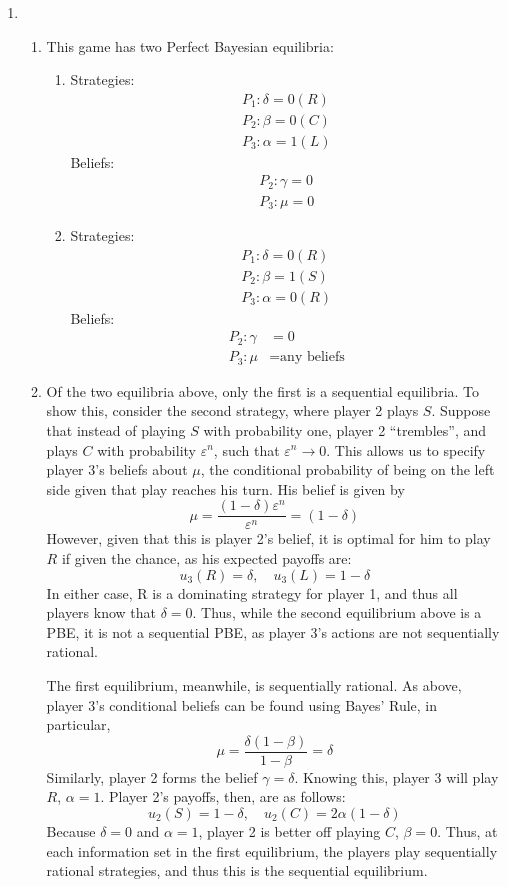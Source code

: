 \documentclass[11pt]{article}
\begin{document}
\begin{enumerate}
	\item \begin{enumerate}
		\item This game has two Perfect Bayesian equilibria:
		\begin{enumerate}[label = \roman*.]
			\item Strategies:
			\begin{gather*}
			P_1: \delta = 0 (R) \\
			P_2: \beta = 0 (C) \\
			P_3: \alpha = 1 (L)
			\end{gather*}
			Beliefs:
			\begin{gather*}
			P_2: \gamma = 0 \\
			P_3: \mu = 0
			\end{gather*}
			
			\item Strategies:
			\begin{gather*}
			P_1: \delta = 0 (R) \\
			P_2: \beta = 1 (S) \\
			P_3: \alpha = 0 (R)
			\end{gather*}
			Beliefs:
			\begin{align*}
			P_2: \gamma &= 0 \\
			P_3: \mu &= \text{any beliefs}
			\end{align*}
		\end{enumerate}
	
		\item Of the two equilibria above, only the first is a sequential equilibria. To show this, consider the second strategy, where player 2 plays $ S $. Suppose that instead of playing $ S $ with probability one, player 2 ``trembles'', and plays $ C $ with probability $ \varepsilon^n $, such that $ \varepsilon^n\to 0 $. This allows us to specify player 3's beliefs about $\mu$, the conditional probability of being on the left side given that play reaches his turn. His belief is given by
		\[\mu = \frac{(1 - \delta)\varepsilon^n}{\varepsilon^n} = (1 - \delta)\]
		However, given that this is player 2's belief, it is optimal for him to play $ R $ if given the chance, as his expected payoffs are:
		\[u_3(R) = \delta,\quad u_3(L) = 1 - \delta \]
		In either case, R is a dominating strategy for player 1, and thus all players know that $\delta = 0$. Thus, while the second equilibrium above is a PBE, it is not a sequential PBE, as player 3's actions are not sequentially rational. 
		
		The first equilibrium, meanwhile, is sequentially rational. As above, player 3's conditional beliefs can be found using Bayes' Rule, in particular,
		\[\mu = \frac{\delta (1 - \beta)}{1 - \beta} = \delta\]
		Similarly, player 2 forms the belief $ \gamma = \delta $. Knowing this, player 3 will play $ R $, $\alpha = 1$. Player 2's payoffs, then, are as follows:
		\[u_2(S) = 1 - \delta, \quad u_2(C) = 2\alpha(1 - \delta)\]
		Because $\delta = 0$ and $\alpha = 1$, player 2 is better off playing $ C $, $\beta = 0$. Thus, at each information set in the first equilibrium, the players play sequentially rational strategies, and thus this is the sequential equilibrium. 
	\end{enumerate}
\end{enumerate}
\end{document}
